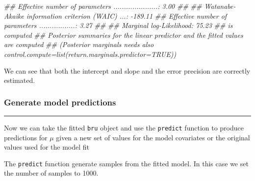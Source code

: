 \documentclass[
  letterpaper,
  DIV=11,
  numbers=noendperiod]{scrartcl}
\newenvironment{Shaded}{\begin{snugshade}}{\end{snugshade}}
\newcommand{\AttributeTok}[1]{\textcolor[rgb]{0.40,0.45,0.13}{#1}}
\newcommand{\ConstantTok}[1]{\textcolor[rgb]{0.56,0.35,0.01}{#1}}
\newcommand{\DecValTok}[1]{\textcolor[rgb]{0.68,0.00,0.00}{#1}}
\newcommand{\DocumentationTok}[1]{\textcolor[rgb]{0.37,0.37,0.37}{\textit{#1}}}
\newcommand{\FunctionTok}[1]{\textcolor[rgb]{0.28,0.35,0.67}{#1}}
\newcommand{\NormalTok}[1]{\textcolor[rgb]{0.00,0.23,0.31}{#1}}
\newcommand{\OtherTok}[1]{\textcolor[rgb]{0.00,0.23,0.31}{#1}}
\newcommand{\SpecialCharTok}[1]{\textcolor[rgb]{0.37,0.37,0.37}{#1}}
\begin{document}
\begin{Shaded}
\begin{Highlighting}[]
\DocumentationTok{\#\# Effective number of parameters .....................: 3.00}
\DocumentationTok{\#\# }
\DocumentationTok{\#\# Watanabe{-}Akaike information criterion (WAIC) ...: {-}189.11}
\DocumentationTok{\#\# Effective number of parameters .................: 3.27}
\DocumentationTok{\#\# }
\DocumentationTok{\#\# Marginal log{-}Likelihood:  75.23 }
\DocumentationTok{\#\#  is computed }
\DocumentationTok{\#\# Posterior summaries for the linear predictor and the fitted values are computed}
\DocumentationTok{\#\# (Posterior marginals needs also \textquotesingle{}control.compute=list(return.marginals.predictor=TRUE)\textquotesingle{})}
\end{Highlighting}
\end{Shaded}

We can see that both the intercept and slope and the error precision are
correctly estimated.

\subsubsection{Generate model
predictions}\label{generate-model-predictions}

\begin{center}\rule{0.5\linewidth}{0.5pt}\end{center}

Now we can take the fitted \texttt{bru} object and use the
\texttt{predict} function to produce predictions for \(\mu\) given a new
set of values for the model covariates or the original values used for
the model fit

\begin{Shaded}
\end{Shaded}

The \texttt{predict} function generate samples from the fitted model. In
this case we set the number of samples to 1000.
\end{document}
